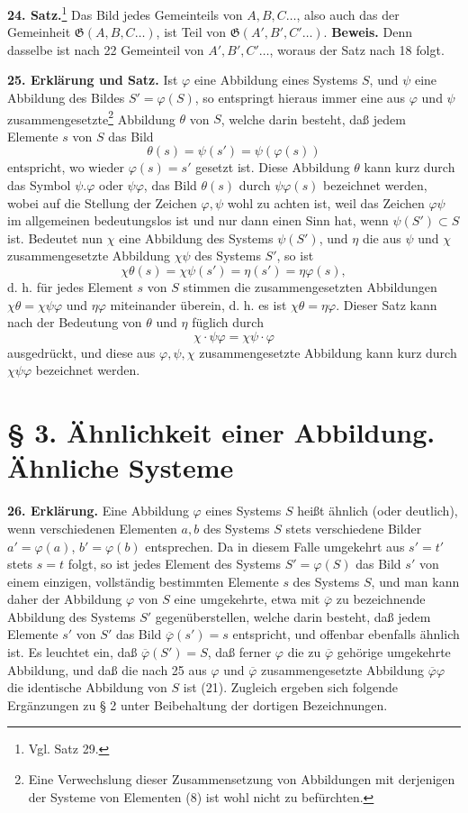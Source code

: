 \documentclass[11pt]{article}
\newcommand{\Gf}{\mathfrak{G}}
\newcommand{\partof}{\mathrel{\subset}}
\begin{document}
\noindent\textbf{24. Satz.}\footnote{Vgl. Satz 29.} Das Bild jedes Gemeinteils von $A,B,C\ldots$, also auch das der Gemeinheit $\Gf(A,B,C\ldots)$, ist Teil von $\Gf(A',B',C'\ldots)$. \textbf{Beweis.} Denn dasselbe ist nach 22 Gemeinteil von $A',B',C'\ldots$, woraus der Satz nach 18 folgt.

\noindent\textbf{25. Erklärung und Satz.} Ist $\varphi$ eine Abbildung eines Systems $S$, und $\psi$ eine Abbildung des Bildes $S'=\varphi(S)$, so entspringt hieraus immer eine aus $\varphi$ und $\psi$ zusammengesetzte\footnote{Eine Verwechslung dieser Zusammensetzung von Abbildungen mit derjenigen der Systeme von Elementen (8) ist wohl nicht zu befürchten.} Abbildung $\theta$ von $S$, welche darin besteht, daß jedem Elemente $s$ von $S$ das Bild
\[
\theta(s)=\psi(s')=\psi(\varphi(s))
\]
entspricht, wo wieder $\varphi(s)=s'$ gesetzt ist. Diese Abbildung $\theta$ kann kurz durch das Symbol $\psi.\varphi$ oder $\psi\varphi$, das Bild $\theta(s)$ durch $\psi\varphi(s)$ bezeichnet werden, wobei auf die Stellung der Zeichen $\varphi,\psi$ wohl zu achten ist, weil das Zeichen $\varphi\psi$ im allgemeinen bedeutungslos ist und nur dann einen Sinn hat, wenn $\psi(S')\partof S$ ist. Bedeutet nun $\chi$ eine Abbildung des Systems $\psi(S')$, und $\eta$ die aus $\psi$ und $\chi$ zusammengesetzte Abbildung $\chi\psi$ des Systems $S'$, so ist
\[
\chi\theta(s)=\chi\psi(s')=\eta(s')=\eta\varphi(s),
\]
d. h. für jedes Element $s$ von $S$ stimmen die zusammengesetzten Abbildungen $\chi\theta=\chi\psi\varphi$ und $\eta\varphi$ miteinander überein, d. h. es ist $\chi\theta=\eta\varphi$. Dieser Satz kann nach der Bedeutung von $\theta$ und $\eta$ füglich durch
\[
\chi\cdot\psi\varphi=\chi\psi\cdot\varphi
\]
ausgedrückt, und diese aus $\varphi,\psi,\chi$ zusammengesetzte Abbildung kann kurz durch $\chi\psi\varphi$ bezeichnet werden.

\section*{§ 3. Ähnlichkeit einer Abbildung. Ähnliche Systeme}

\noindent\textbf{26. Erklärung.} Eine Abbildung $\varphi$ eines Systems $S$ heißt ähnlich (oder deutlich), wenn verschiedenen Elementen $a,b$ des Systems $S$ stets verschiedene Bilder $a'=\varphi(a)$, $b'=\varphi(b)$ entsprechen. Da in diesem Falle umgekehrt aus $s'=t'$ stets $s=t$ folgt, so ist jedes Element des Systems $S'=\varphi(S)$ das Bild $s'$ von einem einzigen, vollständig bestimmten Elemente $s$ des Systems $S$, und man kann daher der Abbildung $\varphi$ von $S$ eine umgekehrte, etwa mit $\overline{\varphi}$ zu bezeichnende Abbildung des Systems $S'$ gegenüberstellen, welche darin besteht, daß jedem Elemente $s'$ von $S'$ das Bild $\overline{\varphi}(s')=s$ entspricht, und offenbar ebenfalls ähnlich ist. Es leuchtet ein, daß $\overline{\varphi}(S')=S$, daß ferner $\varphi$ die zu $\overline{\varphi}$ gehörige umgekehrte Abbildung, und daß die nach 25 aus $\varphi$ und $\overline{\varphi}$ zusammengesetzte Abbildung $\overline{\varphi}\varphi$ die identische Abbildung von $S$ ist (21). Zugleich ergeben sich folgende Ergänzungen zu § 2 unter Beibehaltung der dortigen Bezeichnungen.
\end{document}
